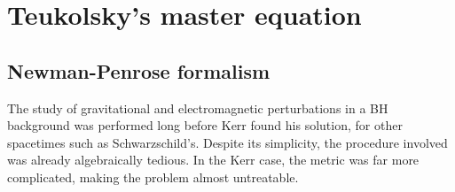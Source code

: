 
\chapter{Teukolsky's master equation} %
\label{Chapter3}


\section{Newman-Penrose formalism}

The study of gravitational and electromagnetic perturbations in a BH background was performed long before Kerr found his solution, for other spacetimes such as Schwarzschild's.
Despite its simplicity, the procedure involved was already algebraically tedious.
In the Kerr case, the metric was far more complicated, making the problem almost untreatable.

